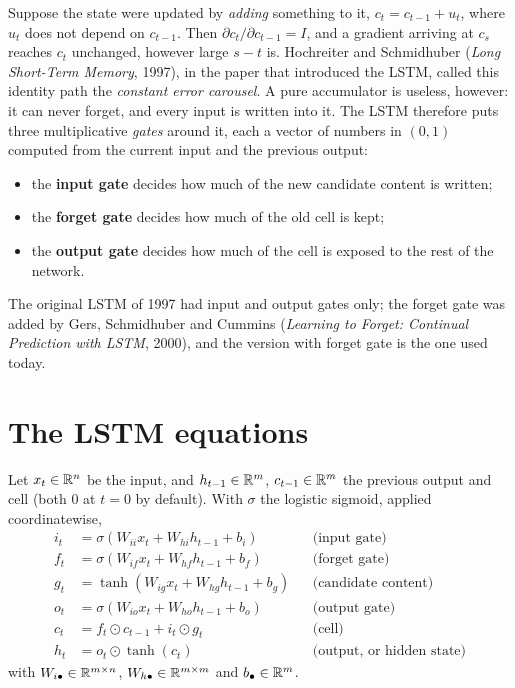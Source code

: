 \begin{notechapter}
Suppose the state were updated by \emph{adding} something to it, $c_t = c_{t-1} + u_t$, where $u_t$
does not depend on $c_{t-1}$. Then $\partial c_t/\partial c_{t-1} = I$, and a gradient arriving at $c_s$ reaches $c_t$
unchanged, however large $s - t$ is. Hochreiter and Schmidhuber (\emph{Long Short-Term Memory}, 1997), in the paper that introduced
the LSTM, called this identity path the \emph{constant error carousel}. A pure accumulator is useless,
however: it can never forget, and every input is written into it. The LSTM therefore puts
three multiplicative \emph{gates} around it, each a vector of numbers in $(0,1)$ computed from the
current input and the previous output:
\begin{itemize}[nosep]
  \item the \textbf{input gate} decides how much of the new candidate content is written;
  \item the \textbf{forget gate} decides how much of the old cell is kept;
  \item the \textbf{output gate} decides how much of the cell is exposed to the rest of
        the network.
\end{itemize}
The original LSTM of 1997 had input and output gates only; the forget gate was added by
Gers, Schmidhuber and Cummins (\emph{Learning to Forget: Continual Prediction with LSTM},
2000), and the version with forget gate is the one used today.

\section{The LSTM equations}\label{gated-rnn:sec:lstm}

\begin{definition}\label{gated-rnn:def:lstm}
Let $x_t\in\mathbb{R}^n$ be the input, and $h_{t-1}\in\mathbb{R}^m$, $c_{t-1}\in\mathbb{R}^m$ the previous output and cell (both $0$ at $t = 0$
by default). With $\sigma$ the logistic sigmoid, applied coordinatewise,
\begin{align*}
  i_t &= \sigma(W_{ii}x_t + W_{hi}h_{t-1} + b_i) &&\text{(input gate)}\\
  f_t &= \sigma(W_{if}x_t + W_{hf}h_{t-1} + b_f) &&\text{(forget gate)}\\
  g_t &= \tanh(W_{ig}x_t + W_{hg}h_{t-1} + b_g) &&\text{(candidate content)}\\
  o_t &= \sigma(W_{io}x_t + W_{ho}h_{t-1} + b_o) &&\text{(output gate)}\\
  c_t &= f_t\odot c_{t-1} + i_t\odot g_t &&\text{(cell)}\\
  h_t &= o_t\odot\tanh(c_t) &&\text{(output, or hidden state)}
\end{align*}
with $W_{i\bullet}\in\mathbb{R}^{m\times n}$, $W_{h\bullet}\in\mathbb{R}^{m\times m}$ and $b_\bullet\in\mathbb{R}^m$.
\end{definition}


\end{notechapter}
